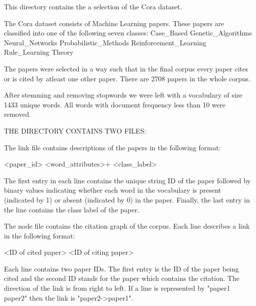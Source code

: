 This directory contains the a selection of the Cora dataset.

The Cora dataset consists of Machine Learning papers. These papers are classified into one of the following seven classes:
		Case_Based
		Genetic_Algorithms
		Neural_Networks
		Probabilistic_Methods
		Reinforcement_Learning
		Rule_Learning
		Theory

The papers were selected in a way such that in the final corpus every paper cites or is cited by atleast one other paper. There are 2708 papers in the whole corpus. 

After stemming and removing stopwords we were left with a vocabulary of size 1433 unique words. All words with document frequency less than 10 were removed.


THE DIRECTORY CONTAINS TWO FILES:

The link file contains descriptions of the papers in the following format:

		<paper_id> <word_attributes>+ <class_label>

The first entry in each line contains the unique string ID of the paper followed by binary values indicating whether each word in the vocabulary is present (indicated by 1) or absent (indicated by 0) in the paper. Finally, the last entry in the line contains the class label of the paper.

The node file contains the citation graph of the corpus. Each line describes a link in the following format:

		<ID of cited paper> <ID of citing paper>

Each line contains two paper IDs. The first entry is the ID of the paper being cited and the second ID stands for the paper which contains the citation. The direction of the link is from right to left. If a line is represented by "paper1 paper2" then the link is "paper2->paper1". 

